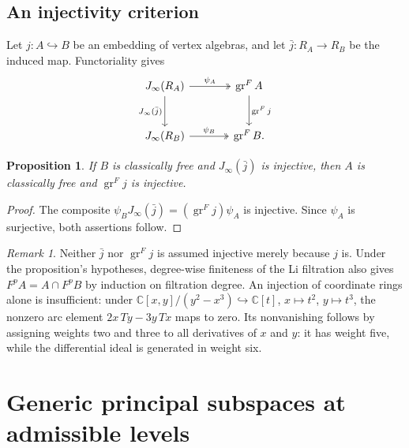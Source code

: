 \documentclass[11pt]{amsart}
\newtheorem{proposition}[theorem]{Proposition}
\theoremstyle{definition}
\theoremstyle{remark}
\newtheorem{remark}[theorem]{Remark}
\newcommand{\C}{\mathbb C}
\newcommand{\J}{J_\infty}
\DeclareMathOperator{\gr}{gr}
\begin{document}
\subsection{An injectivity criterion}\label{sec:criterion}
Let $j:A\hookrightarrow B$ be an embedding of vertex algebras, and let
$\bar j:R_A\to R_B$ be the induced map. Functoriality gives
\begin{equation}\label{eq:diagram}
\begin{tikzcd}[column sep=large,row sep=large]
\J(R_A)\arrow[r,two heads,"\psi_A"]\arrow[d,"\J(\bar j)"']&
\gr^F A\arrow[d,"\gr^Fj"]\\
\J(R_B)\arrow[r,two heads,"\psi_B"]&\gr^F B.
\end{tikzcd}
\end{equation}
\begin{proposition}\label{thm:criterion}
If $B$ is classically free and $\J(\bar j)$ is injective, then $A$ is
classically free and $\gr^Fj$ is injective.
\end{proposition}
\begin{proof}
The composite $\psi_B\J(\bar j)=(\gr^Fj)\psi_A$ is injective.
Since $\psi_A$ is surjective, both assertions follow.
\end{proof}
\begin{remark}\label{rem:strictness} \cite{AL1}
Neither $\bar j$ nor $\gr^Fj$ is assumed injective merely because $j$ is.
Under the proposition's hypotheses, degree-wise finiteness of the Li
filtration also gives $F^pA=A\cap F^pB$ by induction on filtration degree.
An injection of coordinate rings alone is insufficient: under
$\C[x,y]/(y^2-x^3)\hookrightarrow\C[t]$, $x\mapsto t^2$, $y\mapsto t^3$,
the nonzero arc element $2x\,Ty-3y\,Tx$ maps to zero. Its nonvanishing
follows by assigning weights two and three to all derivatives of $x$ and
$y$: it has weight five, while the differential ideal is generated in
weight six. 
\end{remark}


\section{Generic principal subspaces at admissible levels}
\label{sec:classification}
\end{document}
